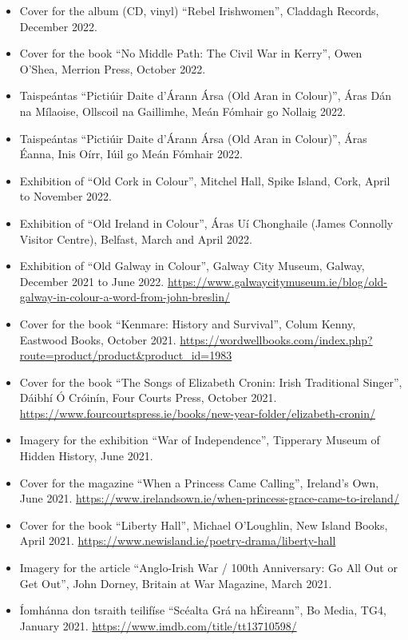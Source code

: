 \documentclass[10pt,a4paper]{res} %
\begin{document}
\begin{resume}
\begin{itemize}
\item Cover for the album (CD, vinyl) ``Rebel Irishwomen'', Claddagh Records, December 2022.
\item Cover for the book ``No Middle Path: The Civil War in Kerry'', Owen O'Shea, Merrion Press, October 2022.
\item Taispe\'{a}ntas ``Picti\'{u}ir Daite d'\'{A}rann \'{A}rsa (Old Aran in Colour)'', \'{A}ras D\'{a}n na M\'{i}laoise, Ollscoil na Gaillimhe, Me\'{a}n F\'{o}mhair go Nollaig 2022.
\item Taispe\'{a}ntas ``Picti\'{u}ir Daite d'\'{A}rann \'{A}rsa (Old Aran in Colour)'', \'{A}ras \'{E}anna, Inis O\'{i}rr, I\'{uil} go Me\'{a}n F\'{o}mhair 2022.
\item Exhibition of ``Old Cork in Colour'', Mitchel Hall, Spike Island, Cork, April to November 2022.
\item Exhibition of ``Old Ireland in Colour'', \'{A}ras U\'{i} Chonghaile (James Connolly Visitor Centre), Belfast, March and April 2022.
\item Exhibition of ``Old Galway in Colour'', Galway City Museum, Galway, December 2021 to June 2022. \url{https://www.galwaycitymuseum.ie/blog/old-galway-in-colour-a-word-from-john-breslin/}
\item Cover for the book ``Kenmare: History and Survival'', Colum Kenny, Eastwood Books, October 2021. \url{https://wordwellbooks.com/index.php?route=product/product&product_id=1983}
\item Cover for the book ``The Songs of Elizabeth Cronin: Irish Traditional Singer'', D\'{a}ibh\'{i} \'{O} Cr\'{o}in\'{i}n, Four Courts Press, October 2021. \url{https://www.fourcourtspress.ie/books/new-year-folder/elizabeth-cronin/}
\item Imagery for the exhibition ``War of Independence'', Tipperary Museum of Hidden History, June 2021.
\item Cover for the magazine ``When a Princess Came Calling'', Ireland's Own, June 2021. \url{https://www.irelandsown.ie/when-princess-grace-came-to-ireland/} 
\item Cover for the book ``Liberty Hall'', Michael O'Loughlin, New Island Books, April 2021. \url{https://www.newisland.ie/poetry-drama/liberty-hall}
\item Imagery for the article ``Anglo-Irish War / 100th Anniversary: Go All Out or Get Out'', John Dorney, Britain at War Magazine, March 2021.
\item \'{I}omh\'{a}nna don tsraith teilif\'{i}se ``Sc\'{e}alta Gr\'{a} na h\'{E}ireann'', Bo Media, TG4, January 2021. \url{https://www.imdb.com/title/tt13710598/}

\end{itemize}
\end{resume}
\end{document}
